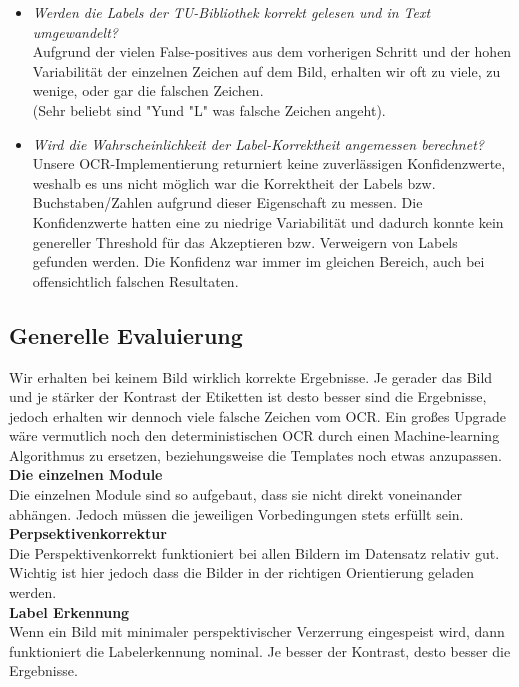 \documentclass[paper=A4, deutsch]{scrartcl}
\begin{document}
\begin{itemize}
	\item \textit{Werden die Labels der TU-Bibliothek korrekt gelesen und in Text umgewandelt?}\\
		  Aufgrund der vielen False-positives aus dem vorherigen Schritt und der hohen Variabilität der einzelnen Zeichen auf dem Bild, erhalten wir oft zu viele, zu wenige, oder gar die falschen Zeichen.\\(Sehr beliebt sind "Y\dq  und "L" was falsche Zeichen angeht).
		  
	\item \textit{Wird die Wahrscheinlichkeit der Label-Korrektheit angemessen berechnet?}\\
		  Unsere OCR-Implementierung returniert keine zuverlässigen Konfidenzwerte, weshalb es uns nicht möglich war die Korrektheit der Labels bzw. Buchstaben/Zahlen aufgrund dieser Eigenschaft zu messen. Die Konfidenzwerte hatten eine zu niedrige Variabilität und dadurch konnte kein genereller Threshold für das Akzeptieren bzw. Verweigern von Labels gefunden werden. Die Konfidenz war immer im gleichen Bereich, auch bei offensichtlich falschen Resultaten.
		  
\end{itemize}
\subsection{Generelle Evaluierung}
Wir erhalten bei keinem Bild wirklich korrekte Ergebnisse. Je gerader das Bild und je stärker der Kontrast der Etiketten ist desto besser sind die Ergebnisse, jedoch erhalten wir dennoch viele falsche Zeichen vom OCR. Ein großes Upgrade wäre vermutlich noch den deterministischen OCR durch einen Machine-learning Algorithmus zu ersetzen, beziehungsweise die Templates noch etwas anzupassen.\\

\textbf{Die einzelnen Module}\\
Die einzelnen Module sind so aufgebaut, dass sie nicht direkt voneinander abhängen. Jedoch müssen die jeweiligen Vorbedingungen stets erfüllt sein.\\

\textbf{Perpsektivenkorrektur}\\
Die Perspektivenkorrekt funktioniert bei allen Bildern im Datensatz relativ gut. Wichtig ist hier jedoch dass die Bilder in der richtigen Orientierung geladen werden.\\

\textbf{Label Erkennung}\\
Wenn ein Bild mit minimaler perspektivischer Verzerrung eingespeist wird, dann funktioniert die Labelerkennung nominal. Je besser der Kontrast, desto besser die Ergebnisse.\\
\end{document}
